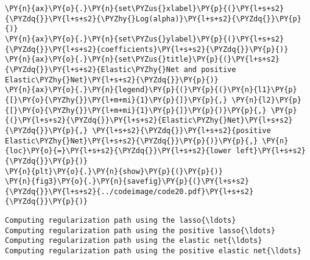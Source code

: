 \begin{Verbatim}[commandchars=\\\{\}]
\PY{n}{ax}\PY{o}{.}\PY{n}{set\PYZus{}xlabel}\PY{p}{(}\PY{l+s+s2}{\PYZdq{}}\PY{l+s+s2}{\PYZhy{}Log(alpha)}\PY{l+s+s2}{\PYZdq{}}\PY{p}{)}
\PY{n}{ax}\PY{o}{.}\PY{n}{set\PYZus{}ylabel}\PY{p}{(}\PY{l+s+s2}{\PYZdq{}}\PY{l+s+s2}{coefficients}\PY{l+s+s2}{\PYZdq{}}\PY{p}{)}
\PY{n}{ax}\PY{o}{.}\PY{n}{set\PYZus{}title}\PY{p}{(}\PY{l+s+s2}{\PYZdq{}}\PY{l+s+s2}{Elastic\PYZhy{}Net and positive Elastic\PYZhy{}Net}\PY{l+s+s2}{\PYZdq{}}\PY{p}{)}
\PY{n}{ax}\PY{o}{.}\PY{n}{legend}\PY{p}{(}\PY{p}{(}\PY{n}{l1}\PY{p}{[}\PY{o}{\PYZhy{}}\PY{l+m+mi}{1}\PY{p}{]}\PY{p}{,} \PY{n}{l2}\PY{p}{[}\PY{o}{\PYZhy{}}\PY{l+m+mi}{1}\PY{p}{]}\PY{p}{)}\PY{p}{,} \PY{p}{(}\PY{l+s+s2}{\PYZdq{}}\PY{l+s+s2}{Elastic\PYZhy{}Net}\PY{l+s+s2}{\PYZdq{}}\PY{p}{,} \PY{l+s+s2}{\PYZdq{}}\PY{l+s+s2}{positive Elastic\PYZhy{}Net}\PY{l+s+s2}{\PYZdq{}}\PY{p}{)}\PY{p}{,} \PY{n}{loc}\PY{o}{=}\PY{l+s+s2}{\PYZdq{}}\PY{l+s+s2}{lower left}\PY{l+s+s2}{\PYZdq{}}\PY{p}{)}
\PY{n}{plt}\PY{o}{.}\PY{n}{show}\PY{p}{(}\PY{p}{)}
\PY{n}{fig3}\PY{o}{.}\PY{n}{savefig}\PY{p}{(}\PY{l+s+s2}{\PYZdq{}}\PY{l+s+s2}{../codeimage/code20.pdf}\PY{l+s+s2}{\PYZdq{}}\PY{p}{)}
\end{Verbatim}

\begin{Verbatim}[commandchars=\\\{\}]
Computing regularization path using the lasso{\ldots}
Computing regularization path using the positive lasso{\ldots}
Computing regularization path using the elastic net{\ldots}
Computing regularization path using the positive elastic net{\ldots}
\end{Verbatim}
